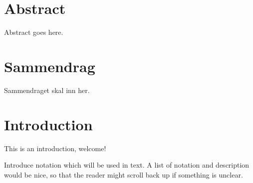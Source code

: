 \chapter*{Abstract}
    Abstract goes here.

\chapter*{Sammendrag}
    Sammendraget skal inn her.

\chapter*{Introduction}
        This is an introduction, welcome! 
        
        Introduce notation which will be used in text. A list of notation and description would be nice, so that the reader might scroll back up if something is unclear.

